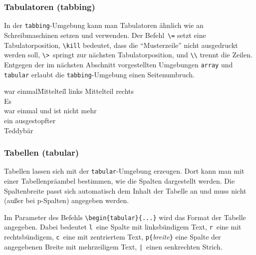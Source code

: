 \subsubsection{Tabulatoren (tabbing)} \label{tabbing}

In der \texttt{tabbing}-Umgebung kann man Tabulatoren ähnlich wie
an Schreibmaschinen setzen und verwenden.
Der Befehl~\lstinline|\=| setzt eine Tabulatorposition,
\lstinline|\kill| bedeutet, dass die "`Musterzeile"' nicht ausgedruckt werden
soll,
\lstinline|\>|~springt zur nächsten Tabulatorposition,
und \lstinline|\\| trennt die Zeilen. Entgegen der im nächsten Abschnitt
vorgestellten Umgebungen \texttt{array} und \texttt{tabular} erlaubt
die \texttt{tabbing}-Umgebung einen Seitenumbruch.

%
\begin{LTXexample}
\begin{tabbing}
war einmal\quad \=
 Mittelteil\quad \= \kill
links \> Mittelteil \> rechts\\
Es \\
war einmal \> und ist
 \> nicht mehr\\
ein  \>  \> ausgestopfter\\
 \>  \> Teddybär
\end{tabbing}
\end{LTXexample}


\subsubsection{Tabellen (tabular)} \label{tabular}

Tabellen lassen sich mit der \texttt{tabular}-Umgebung erzeugen. Dort kann man mit einer Tabellenpräambel bestimmen, wie die Spalten dargestellt werden. Die Spaltenbreite passt sich automatisch dem Inhalt der Tabelle an und muss nicht (außer bei p-Spalten) angegeben werden.

Im Parameter des Befehls \lstinline|\begin{tabular}{...}| wird das
Format der Tabelle angegeben.
Dabei bedeutet
\texttt{l}~eine Spalte mit linksbündigem Text,
\texttt{r}~eine mit rechtsbündigem,
\texttt{c}~eine mit zentriertem Text,
\lstinline|p{|\textit{breite}\lstinline|}| eine Spalte der angegebenen
Breite mit mehrzeiligem Text,
\lstinline.|.~einen senkrechten Strich.

